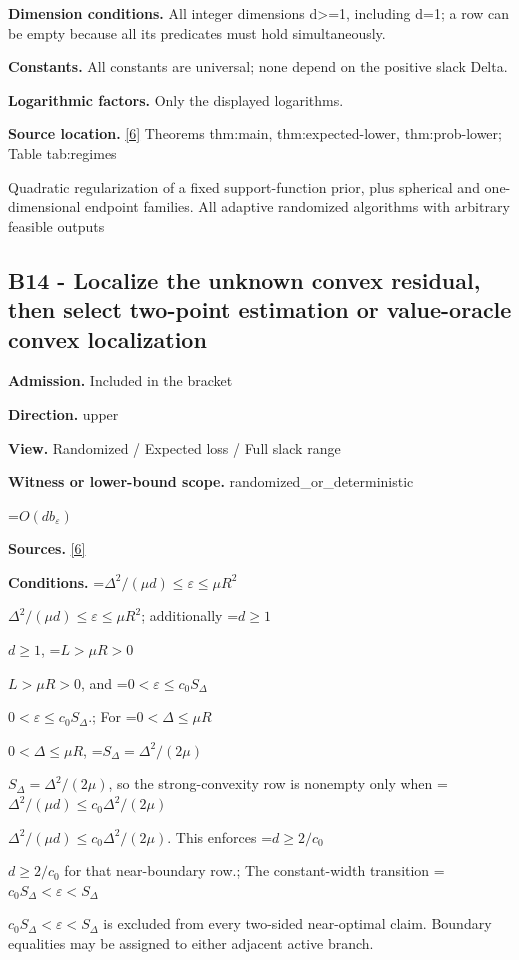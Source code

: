 \documentclass[10pt,a4paper]{article}
\newcommand{\AtlasMath}[1]{\par\begingroup\centering\setbox0=\hbox{$\displaystyle #1$}\ifdim\wd0>1.4\linewidth\typeout{ATLAS WIDE FORMULA: \the\wd0}\fi\ifdim\wd0>\linewidth\resizebox{\linewidth}{!}{\box0}\else\box0\fi\par\endgroup}
\newcommand{\AtlasInlineMath}[1]{\begingroup\setbox0=\hbox{$#1$}\ifdim\wd0>.4\linewidth\endgroup\AtlasMath{#1}\else\endgroup$#1$\fi}
\begin{document}
\textbf{Dimension conditions.} All integer dimensions d>=1, including d=1; a row can be empty because all its predicates must hold simultaneously.



\textbf{Constants.} All constants are universal; none depend on the positive slack Delta.



\textbf{Logarithmic factors.} Only the displayed logarithms.



\textbf{Source location.} \href{https://github.com/WU-Wendao/Colombo/blob/main/colombo_sensorium/Complexity_altas/data/sources/colombo/U10/manuscript.pdf}{[6]} Theorems thm:main, thm:expected-lower, thm:prob-lower; Table tab:regimes



Quadratic regularization of a fixed support-function prior, plus spherical and one-dimensional endpoint families. All adaptive randomized algorithms with arbitrary feasible outputs



\subsection{B14 - Localize the unknown convex residual, then select two-point estimation or value-oracle convex localization}


\textbf{Admission.} Included in the bracket



\textbf{Direction.} upper



\textbf{View.} Randomized / Expected loss / Full slack range



\textbf{Witness or lower-bound scope.} randomized\_or\_deterministic



\AtlasMath{O(db_\varepsilon)}


\textbf{Sources.} \href{https://github.com/WU-Wendao/Colombo/blob/main/colombo_sensorium/Complexity_altas/data/sources/colombo/U10/manuscript.pdf}{[6]}



\textbf{Conditions.} \AtlasInlineMath{\Delta^2/(\mu d)\le\varepsilon\le\mu R^2}; additionally \AtlasInlineMath{d\ge1}, \AtlasInlineMath{L>\mu R>0}, and \AtlasInlineMath{0<\varepsilon\le c_0S_\Delta}.; For \AtlasInlineMath{0<\Delta\le\mu R}, \AtlasInlineMath{S_\Delta=\Delta^2/(2\mu)}, so the strong-convexity row is nonempty only when \AtlasInlineMath{\Delta^2/(\mu d)\le c_0\Delta^2/(2\mu)}. This enforces \AtlasInlineMath{d\ge2/c_0} for that near-boundary row.; The constant-width transition \AtlasInlineMath{c_0S_\Delta<\varepsilon<S_\Delta} is excluded from every two-sided near-optimal claim. Boundary equalities may be assigned to either adjacent active branch.
\end{document}
